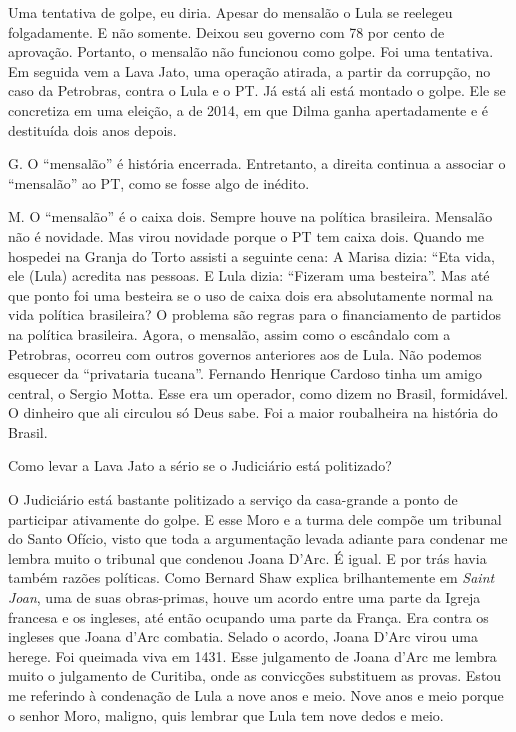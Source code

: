  Uma tentativa de golpe, eu diria. Apesar do mensalão o Lula se
reelegeu folgadamente. E não somente. Deixou seu governo com 78 por
cento de aprovação. Portanto, o mensalão não funcionou como golpe. Foi
uma tentativa. Em seguida vem a Lava Jato, uma operação atirada, a
partir da corrupção, no caso da Petrobras, contra o Lula e o PT. Já está
ali está montado o golpe. Ele se concretiza em uma eleição, a de 2014,
em que Dilma ganha apertadamente e é destituída dois anos depois.

G. O ``mensalão'' é história encerrada. Entretanto, a direita continua a
associar o ``mensalão'' ao PT, como se fosse algo de inédito.

M. O ``mensalão'' é o caixa dois. Sempre houve na política brasileira.
Mensalão não é novidade. Mas virou novidade porque o PT tem caixa dois.
Quando me hospedei na Granja do Torto assisti a seguinte cena: A Marisa
dizia: ``Eta vida, ele (Lula) acredita nas pessoas. E Lula dizia:
``Fizeram uma besteira''. Mas até que ponto foi uma besteira se o uso de
caixa dois era absolutamente normal na vida política brasileira? O
problema são regras para o financiamento de partidos na política
brasileira. Agora, o mensalão, assim como o escândalo com a Petrobras,
ocorreu com outros governos anteriores aos de Lula. Não podemos esquecer
da ``privataria tucana''. Fernando Henrique Cardoso tinha um amigo
central, o Sergio Motta. Esse era um operador, como dizem no Brasil,
formidável. O dinheiro que ali circulou só Deus sabe. Foi a maior
roubalheira na história do Brasil.

 Como levar a Lava Jato a sério se o Judiciário está politizado?

 O Judiciário está bastante politizado a serviço da casa-grande a
ponto de participar ativamente do golpe. E esse Moro e a turma dele
compõe um tribunal do Santo Ofício, visto que toda a argumentação levada
adiante para condenar me lembra muito o tribunal que condenou Joana
D'Arc. É igual. E por trás havia também razões políticas. Como Bernard
Shaw explica brilhantemente em \emph{Saint Joan}, uma de suas
obras-primas, houve um acordo entre uma parte da Igreja francesa e os
ingleses, até então ocupando uma parte da França. Era contra os ingleses
que Joana d'Arc combatia. Selado o acordo, Joana D'Arc virou uma herege.
Foi queimada viva em 1431. Esse julgamento de Joana d'Arc me lembra
muito o julgamento de Curitiba, onde as convicções substituem as provas.
Estou me referindo à condenação de Lula a nove anos e meio. Nove anos e
meio porque o senhor Moro, maligno, quis lembrar que Lula tem nove dedos
e meio.

